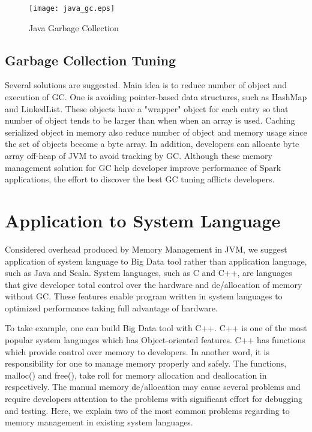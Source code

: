 \begin{figure}[htb]
    \texttt{[image: java\_gc.eps]}
    \caption{Java Garbage Collection}
    \label{fig:Sampling}
\end{figure}


\subsection{Garbage Collection Tuning}
Several solutions are suggested. Main idea is to reduce number of object and execution of GC. 
One is avoiding pointer-based data structures, such as HashMap and LinkedList. These objects have a "wrapper" object for each entry 
so that number of object tends to be larger than when when an array is used. Caching serialized object in memory also reduce number of object and memory usage 
since the set of objects become a byte array. In addition, developers can allocate byte array off-heap of JVM to avoid tracking by GC. 
Although these memory management solution for GC help developer improve performance of Spark applications, the effort to discover the best GC tuning afflicts developers.


\section{Application to System Language}
\label{sec:history}
Considered overhead produced by Memory Management in JVM, we suggest application of system language to Big Data tool rather than application language, such as Java and Scala. 
System languages, such as C and C++, are languages that give developer total control over the hardware and de/allocation of memory without GC. 
These features enable program written in system languages to optimized performance taking full advantage of hardware. 

To take example, one can build Big Data tool with C++. C++ is one of the most popular system languages which has Object-oriented features. 
C++ has functions which provide control over memory to developers. In another word, it is responsibility for one to manage memory properly and safely. 
The functions, malloc() and free(), take roll for memory allocation and deallocation in respectively. The manual memory de/allocation may cause several problems and require developers 
attention to the problems with significant effort for debugging and testing. Here, we explain two of the most common problems regarding to memory management in existing system languages.

